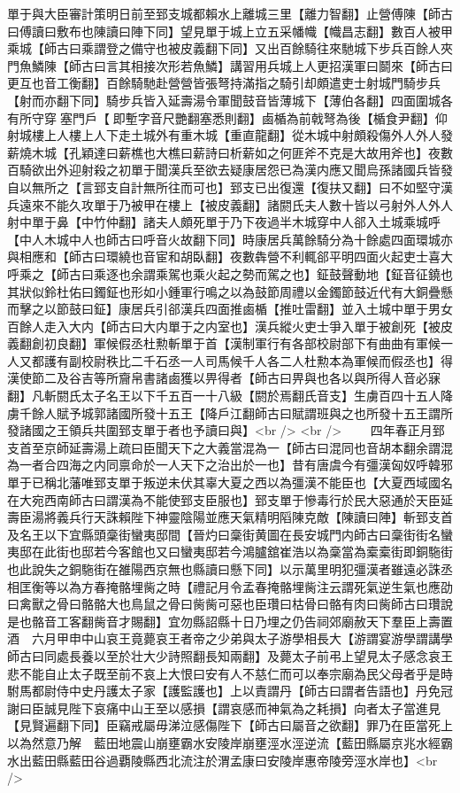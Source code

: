 單于與大臣審計策明日前至郅支城都賴水上離城三里【離力智翻】止營傅陳【師古曰傅讀曰敷布也陳讀曰陣下同】望見單于城上立五采幡幟【幟昌志翻】數百人被甲乘城【師古曰乘謂登之備守也被皮義翻下同】又出百餘騎往來馳城下步兵百餘人夾門魚鱗陳【師古曰言其相接次形若魚鱗】講習用兵城上人更招漢軍曰鬬來【師古曰更互也音工衡翻】百餘騎馳赴營營皆張弩持滿指之騎引却頗遣吏士射城門騎步兵【射而亦翻下同】騎步兵皆入延壽湯令軍聞鼓音皆薄城下【薄伯各翻】四面圍城各有所守穿塞門戶【即塹字音尺艷翻塞悉則翻】鹵楯為前戟弩為後【楯食尹翻】仰射城樓上人樓上人下走土城外有重木城【重直龍翻】從木城中射頗殺傷外人外人發薪燒木城【孔穎達曰薪樵也大樵曰薪詩曰析薪如之何匪斧不克是大故用斧也】夜數百騎欲出外迎射殺之初單于聞漢兵至欲去疑康居怨已為漢内應又聞烏孫諸國兵皆發自以無所之【言郅支自計無所往而可也】郅支已出復還【復扶又翻】曰不如堅守漢兵遠來不能久攻單于乃被甲在樓上【被皮義翻】諸閼氏夫人數十皆以弓射外人外人射中單于鼻【中竹仲翻】諸夫人頗死單于乃下夜過半木城穿中人郤入土城乘城呼【中人木城中人也師古曰呼音火故翻下同】時康居兵萬餘騎分為十餘處四面環城亦與相應和【師古曰環繞也音宦和胡臥翻】夜數犇營不利輒郤平明四面火起吏士喜大呼乘之【師古曰乘逐也余謂乘駕也乘火起之勢而駕之也】鉦鼓聲動地【鉦音征鐃也其狀似鈴杜佑曰鐲鉦也形如小鍾軍行鳴之以為鼓節周禮以金鐲節鼓近代有大銅疊懸而擊之以節鼓曰鉦】康居兵引郤漢兵四面推鹵楯【推吐雷翻】並入土城中單于男女百餘人走入大内【師古曰大内單于之内室也】漢兵縱火吏士爭入單于被創死【被皮義翻創初良翻】軍候假丞杜勲斬單于首【漢制軍行有各部校尉部下有曲曲有軍候一人又都護有副校尉秩比二千石丞一人司馬候千人各二人杜勲本為軍候而假丞也】得漢使節二及谷吉等所齎帛書諸鹵獲以畀得者【師古曰畀與也各以與所得人音必寐翻】凡斬閼氏太子名王以下千五百一十八級【閼於焉翻氏音支】生虜百四十五人降虜千餘人賦予城郭諸國所發十五王【降戶江翻師古曰賦謂班與之也所發十五王謂所發諸國之王領兵共圍郅支單于者也予讀曰與】<br />
<br />
　　四年春正月郅支首至京師延壽湯上疏曰臣聞天下之大義當混為一【師古曰混同也音胡本翻余謂混為一者合四海之内同禀命於一人天下之治出於一也】昔有唐虞今有彊漢匈奴呼韓邪單于已稱北藩唯郅支單于叛逆未伏其辜大夏之西以為彊漢不能臣也【大夏西域國名在大宛西南師古曰謂漢為不能使郅支臣服也】郅支單于慘毒行於民大惡通於天臣延壽臣湯將義兵行天誅賴陛下神靈陰陽並應天氣精明䧟陳克敵【陳讀曰陣】斬郅支首及名王以下宜縣頭稾街蠻夷邸間【晉灼曰稾街黄圖在長安城門内師古曰稾街街名蠻夷邸在此街也邸若今客館也又曰蠻夷邸若今鴻臚舘崔浩以為稾當為槖槖街即銅駞街也此說失之銅駞街在雒陽西京無也縣讀曰懸下同】以示萬里明犯彊漢者雖遠必誅丞相匡衡等以為方春掩骼埋胔之時【禮記月令孟春掩骼埋胔注云謂死氣逆生氣也應劭曰禽獸之骨曰骼骼大也鳥鼠之骨曰胔胔可惡也臣瓚曰枯骨曰骼有肉曰胔師古曰瓚說是也骼音工客翻胔音才賜翻】宜勿縣詔縣十日乃埋之仍告祠郊廟赦天下羣臣上壽置酒　六月甲申中山哀王竟薨哀王者帝之少弟與太子游學相長大【游謂宴游學謂講學師古曰同處長養以至於壮大少詩照翻長知兩翻】及薨太子前弔上望見太子感念哀王悲不能自止太子既至前不哀上大恨曰安有人不慈仁而可以奉宗廟為民父母者乎是時駙馬都尉侍中史丹護太子家【護監護也】上以責謂丹【師古曰謂者告語也】丹免冠謝曰臣誠見陛下哀痛中山王至以感損【謂哀感而神氣為之耗損】向者太子當進見【見賢遍翻下同】臣竊戒屬毋涕泣感傷陛下【師古曰屬音之欲翻】罪乃在臣當死上以為然意乃解　藍田地震山崩壅霸水安陵岸崩壅涇水涇逆流【藍田縣屬京兆水經霸水出藍田縣藍田谷過覇陵縣西北流注於渭孟康曰安陵岸惠帝陵旁涇水岸也】<br />
